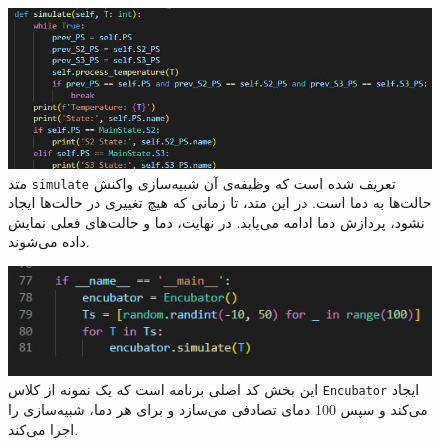\begin{figure}[h]
	\centering
	\includegraphics{4.jpg}
	\caption{متد \texttt{simulate} تعریف شده است که وظیفه‌ی آن شبیه‌سازی واکنش حالت‌ها به دما است. در این متد، تا زمانی که هیچ تغییری در حالت‌ها ایجاد نشود، پردازش دما ادامه می‌یابد. در نهایت، دما و حالت‌های فعلی نمایش داده می‌شوند.}
	\label{fig:label4}
\end{figure}

\begin{figure}[h]
	\centering
	\includegraphics{5.jpg}
	\caption{این بخش کد اصلی برنامه است که یک نمونه از کلاس \texttt{Encubator} ایجاد می‌کند و سپس 100 دمای تصادفی می‌سازد و برای هر دما، شبیه‌سازی را اجرا می‌کند.}
	\label{fig:label5}
\end{figure}